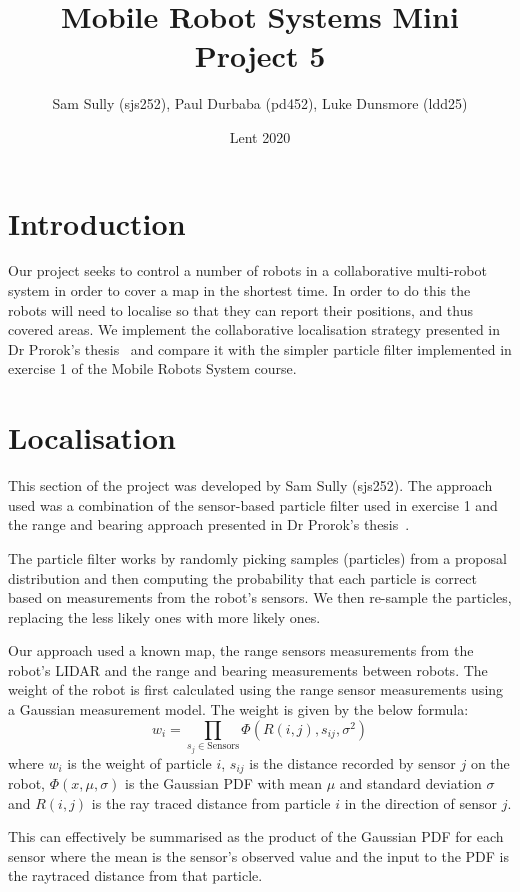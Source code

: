 \documentclass[10pt,a4paper]{article}
\begin{document}
\twocolumn
\title{Mobile Robot Systems Mini Project 5}
\author{Sam Sully (sjs252), Paul Durbaba (pd452), Luke Dunsmore (ldd25)}
\date{Lent 2020}
\maketitle
\section{Introduction}
Our project seeks to control a number of robots in a collaborative multi-robot system in order to cover a map in the shortest time. In order to do this the robots will need to localise so that they can report their positions, and thus covered areas. We implement the collaborative localisation strategy presented in Dr Prorok's thesis~\cite{prorok} and compare it with the simpler particle filter implemented in exercise 1 of the Mobile Robots System course.
\section{Localisation}
This section of the project was developed by Sam Sully (sjs252). The approach used was a combination of the sensor-based particle filter used in exercise 1 and the range and bearing approach presented in Dr Prorok's thesis~\cite{prorok}.

The particle filter works by randomly picking samples (particles) from a proposal distribution and then computing the probability that each particle is correct based on measurements from the robot's sensors. We then re-sample the particles, replacing the less likely ones with more likely ones.

Our approach used a known map, the range sensors measurements from the robot's LIDAR and the range and bearing measurements between robots. The weight of the robot is first calculated using the range sensor measurements using a Gaussian measurement model. The weight is given by the below formula:
\[
	w_i = \prod_{s_{j} \in \mathrm{Sensors}}\Phi(R(i,j), s_{ij}, \sigma^2)
\]
where $w_i$ is the weight of particle $i$, $s_{ij}$ is the distance recorded by sensor $j$ on the robot, $\Phi(x,\mu,\sigma)$ is the Gaussian PDF with mean $\mu$ and standard deviation $\sigma$ and $R(i,j)$ is the ray traced distance from particle $i$ in the direction of sensor $j$.

This can effectively be summarised as the product of the Gaussian PDF for each sensor where the mean is the sensor's observed value and the input to the PDF is the raytraced distance from that particle.
\end{document}
